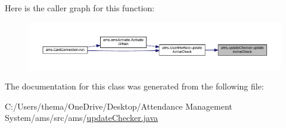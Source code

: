 Here is the caller graph for this function\+:\nopagebreak
\begin{figure}[H]
\begin{center}
\leavevmode
\includegraphics[width=350pt]{classams_1_1update_checker_af796e0298f9cc7abd088f9012c54a33f_icgraph}
\end{center}
\end{figure}


The documentation for this class was generated from the following file\+:\begin{DoxyCompactItemize}
\item 
C\+:/\+Users/thema/\+One\+Drive/\+Desktop/\+Attendance Management System/ams/src/ams/\mbox{\hyperlink{update_checker_8java}{update\+Checker.\+java}}\end{DoxyCompactItemize}
